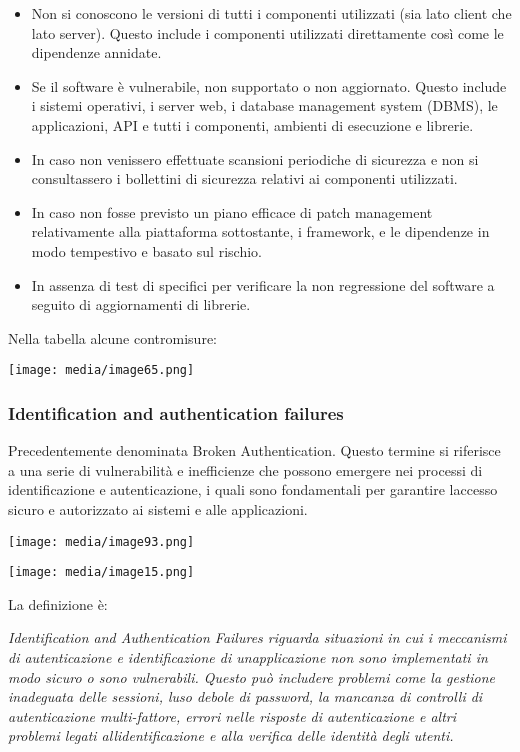 \begin{itemize}
\item
  Non si conoscono le versioni di tutti i componenti utilizzati (sia
  lato client che lato server). Questo include i componenti utilizzati
  direttamente così come le dipendenze annidate.
\item
  Se il software è vulnerabile, non supportato o non aggiornato. Questo
  include i sistemi operativi, i server web, i database management
  system (DBMS), le applicazioni, API e tutti i componenti, ambienti di
  esecuzione e librerie.
\item
  In caso non venissero effettuate scansioni periodiche di sicurezza e
  non si consultassero i bollettini di sicurezza relativi ai componenti
  utilizzati.
\item
  In caso non fosse previsto un piano efficace di patch management
  relativamente alla piattaforma sottostante, i framework, e le
  dipendenze in modo tempestivo e basato sul rischio.
\item
  In assenza di test di specifici per verificare la non regressione del
  software a seguito di aggiornamenti di librerie.
\end{itemize}

Nella tabella alcune contromisure:

\texttt{[image: media/image65.png]}

\subsubsection{Identification and authentication
failures}\label{identification-and-authentication-failures}

Precedentemente denominata Broken Authentication. Questo termine si
riferisce a una serie di vulnerabilità e inefficienze che possono
emergere nei processi di identificazione e autenticazione, i quali sono
fondamentali per garantire l\textquotesingle accesso sicuro e
autorizzato ai sistemi e alle applicazioni.

\texttt{[image: media/image93.png]}

\texttt{[image: media/image15.png]}

La definizione è:

\emph{Identification and Authentication Failures riguarda situazioni in
cui i meccanismi di autenticazione e identificazione di
un\textquotesingle applicazione non sono implementati in modo sicuro o
sono vulnerabili. Questo può includere problemi come la gestione
inadeguata delle sessioni, l\textquotesingle uso debole di password, la
mancanza di controlli di autenticazione multi-fattore, errori nelle
risposte di autenticazione e altri problemi legati
all\textquotesingle identificazione e alla verifica delle identità degli
utenti.}

